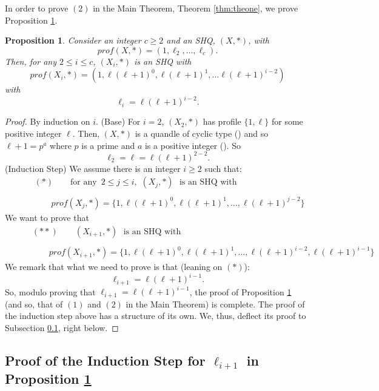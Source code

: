 \documentclass{article}
\newtheorem{proposition}[theorem]{Proposition}
\begin{document}
In order to prove  $(2)$ in the Main Theorem, Theorem \ref{thm:theone}, we prove  Proposition \ref{prop:mainTh}.
\begin{proposition}\label{prop:mainTh}
Consider an integer $c\geq 2$ and an SHQ, $(X, *)$, with $$prof(X,*)=(1, \ell_2, \dots , \ell_c) .$$ Then, for any $2\leq i \leq c$, $(X_i, *)$ is an SHQ with $$prof(X_i, *) = (1, \ell(\ell+1)^0, \ell(\ell+1)^1, \dots \ell(\ell+1)^{i-2})$$ with $$\ell_i=\ell(\ell+1)^{i-2} .$$
\end{proposition}
\begin{proof}
By induction on $i$.
\bigbreak
(Base) For $i=2$, $(X_2,*)$ has profile $\{1, \ell\}$ for  some positive integer $\ell$. Then, $(X,*)$ is a quandle of cyclic type (\cite{Lopes_Roseman}) and so $\ell+1=p^a$ where $p$ is a prime and $a$ is a positive integer (\cite{Vendramin_1}). So $$\ell_2=\ell=\ell(\ell+1)^{2-2} .$$
\bigbreak
(Induction Step) We assume there is an integer $i\geq 2$ such that:
\begin{align*}
&\qquad(*) \qquad\text{for any }\, 2\leq j \leq i, \,\, (X_j, *) \,\, \text{ is an SHQ with} \\ \\
&\qquad \qquad prof(X_j,*)=\{1, \ell(\ell+1)^0, \ell(\ell+1)^1, \dots , \ell(\ell+1)^{j-2}\}
\end{align*}
We want to prove that
\begin{align*}
&\qquad(**) \qquad (X_{i+1}, *) \,\, \text{ is an SHQ with} \\ \\
&\qquad \qquad prof(X_{i+1},*)=\{1, \ell(\ell+1)^0, \ell(\ell+1)^1, \dots , \ell(\ell+1)^{i-2} , \ell(\ell+1)^{i-1}\}
\end{align*}
We remark that what we need to prove is that (leaning on $(*)$): $$\ell_{i+1}=\ell(\ell+1)^{i-1} .$$
So, modulo proving that $\ell_{i+1}=\ell(\ell+1)^{i-1}$, the proof of Proposition \ref{prop:mainTh} (and so, that of  $(1)$ and $(2)$ in the Main Theorem) is complete.
\bigbreak
The proof of the induction step above has a structure of its own. We, thus, deflect its proof to Subsection \ref{subsctn:proofInductionStep}, right below.
\end{proof}



\subsection{Proof of the Induction Step for $\ell_{i+1}$ in Proposition \ref{prop:mainTh}}\label{subsctn:proofInductionStep}
\end{document}

